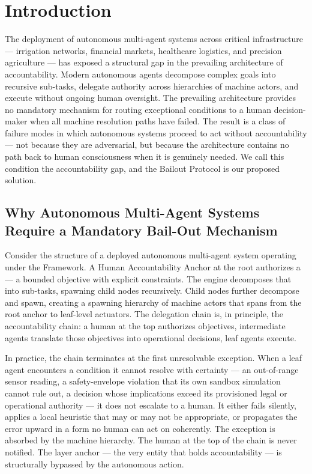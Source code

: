 \section{Introduction}
\label{sec:introduction}

The deployment of autonomous multi-agent systems across critical infrastructure — irrigation networks, financial markets, healthcare logistics, and precision agriculture — has exposed a structural gap in the prevailing architecture of accountability. Modern autonomous agents decompose complex goals into recursive sub-tasks, delegate authority across hierarchies of machine actors, and execute without ongoing human oversight. The prevailing architecture provides no mandatory mechanism for routing exceptional conditions to a human decision-maker when all machine resolution paths have failed. The result is a class of failure modes in which autonomous systems proceed to act without accountability — not because they are adversarial, but because the architecture contains no path back to human consciousness when it is genuinely needed. We call this condition the accountability gap, and the Bailout Protocol is our proposed solution.

\subsection{Why Autonomous Multi-Agent Systems Require a Mandatory Bail-Out Mechanism}

Consider the structure of a deployed autonomous multi-agent system operating under the \bxthree Framework. A Human Accountability Anchor at the root authorizes a \purpose — a bounded objective with explicit constraints. The \bounds engine decomposes that \purpose into sub-tasks, spawning child nodes recursively. Child nodes further decompose and spawn, creating a spawning hierarchy of machine actors that spans from the root anchor to leaf-level actuators. The delegation chain is, in principle, the accountability chain: a human at the top authorizes objectives, intermediate agents translate those objectives into operational decisions, leaf agents execute.

In practice, the chain terminates at the first unresolvable exception. When a leaf agent encounters a condition it cannot resolve with certainty — an out-of-range sensor reading, a safety-envelope violation that its own sandbox simulation cannot rule out, a decision whose implications exceed its provisioned legal or operational authority — it does not escalate to a human. It either fails silently, applies a local heuristic that may or may not be appropriate, or propagates the error upward in a form no human can act on coherently. The exception is absorbed by the machine hierarchy. The human at the top of the chain is never notified. The \purpose layer anchor — the very entity that holds accountability — is structurally bypassed by the autonomous action.

